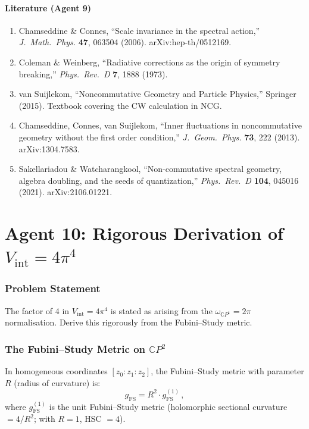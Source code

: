 \documentclass[11pt,a4paper]{article}
\newcommand{\CP}{\mathbb{C}P}
\begin{document}
\subsection{Literature (Agent 9)}

\begin{enumerate}
\item Chamseddine \& Connes, ``Scale invariance in the spectral action,'' \textit{J.\ Math.\ Phys.} \textbf{47}, 063504 (2006). arXiv:hep-th/0512169.
\item Coleman \& Weinberg, ``Radiative corrections as the origin of symmetry breaking,'' \textit{Phys.\ Rev.\ D} \textbf{7}, 1888 (1973).
\item van Suijlekom, ``Noncommutative Geometry and Particle Physics,'' Springer (2015). Textbook covering the CW calculation in NCG.
\item Chamseddine, Connes, van Suijlekom, ``Inner fluctuations in noncommutative geometry without the first order condition,'' \textit{J.\ Geom.\ Phys.} \textbf{73}, 222 (2013). arXiv:1304.7583.
\item Sakellariadou \& Watcharangkool, ``Non-commutative spectral geometry, algebra doubling, and the seeds of quantization,'' \textit{Phys.\ Rev.\ D} \textbf{104}, 045016 (2021). arXiv:2106.01221.
\end{enumerate}


\part{Agent 10: Rigorous Derivation of $V_{\mathrm{int}} = 4\pi^4$}
\label{part:vint}

\section{Problem Statement}

The factor of 4 in $V_{\mathrm{int}} = 4\pi^4$ is stated as arising from the $\omega_{\CP^1} = 2\pi$ normalisation. Derive this rigorously from the Fubini--Study metric.

\section{The Fubini--Study Metric on $\CP^2$}

In homogeneous coordinates $[z_0 : z_1 : z_2]$, the Fubini--Study metric with parameter $R$ (radius of curvature) is:
\begin{equation}
g_{\mathrm{FS}} = R^2 \cdot g_{\mathrm{FS}}^{(1)}\,,
\end{equation}
where $g_{\mathrm{FS}}^{(1)}$ is the unit Fubini--Study metric (holomorphic sectional curvature $= 4/R^2$; with $R = 1$, HSC $= 4$).
\end{document}
